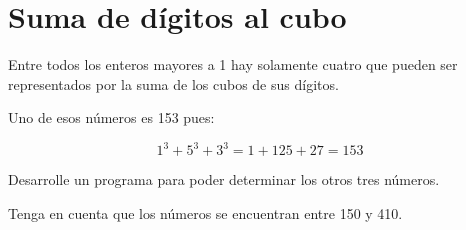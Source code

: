 \section{Suma de dígitos al cubo}

Entre todos los enteros mayores a 1 hay solamente cuatro que pueden ser
representados por la suma de los cubos de sus dígitos.

Uno de esos números es 153 pues:

\[1^3 + 5^3 + 3^3 = 1 + 125 + 27 = 153\]

Desarrolle un programa para poder determinar los otros tres números.

Tenga en cuenta que los números se encuentran entre 150 y 410.
